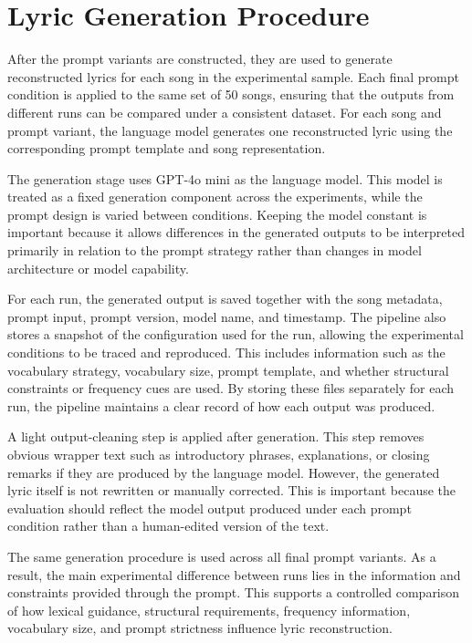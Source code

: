 \section{Lyric Generation Procedure}

After the prompt variants are constructed, they are used to generate reconstructed lyrics for each song in the experimental sample. Each final prompt condition is applied to the same set of 50 songs, ensuring that the outputs from different runs can be compared under a consistent dataset. For each song and prompt variant, the language model generates one reconstructed lyric using the corresponding prompt template and song representation.

The generation stage uses GPT-4o mini as the language model. This model is treated as a fixed generation component across the experiments, while the prompt design is varied between conditions. Keeping the model constant is important because it allows differences in the generated outputs to be interpreted primarily in relation to the prompt strategy rather than changes in model architecture or model capability.

For each run, the generated output is saved together with the song metadata, prompt input, prompt version, model name, and timestamp. The pipeline also stores a snapshot of the configuration used for the run, allowing the experimental conditions to be traced and reproduced. This includes information such as the vocabulary strategy, vocabulary size, prompt template, and whether structural constraints or frequency cues are used. By storing these files separately for each run, the pipeline maintains a clear record of how each output was produced.

A light output-cleaning step is applied after generation. This step removes obvious wrapper text such as introductory phrases, explanations, or closing remarks if they are produced by the language model. However, the generated lyric itself is not rewritten or manually corrected. This is important because the evaluation should reflect the model output produced under each prompt condition rather than a human-edited version of the text.

The same generation procedure is used across all final prompt variants. As a result, the main experimental difference between runs lies in the information and constraints provided through the prompt. This supports a controlled comparison of how lexical guidance, structural requirements, frequency information, vocabulary size, and prompt strictness influence lyric reconstruction.

